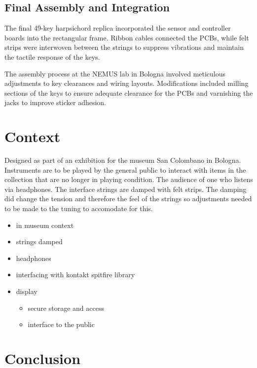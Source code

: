 \subsection{Final Assembly and Integration}

The final 49-key harpsichord replica incorporated the sensor and controller boards into the rectangular frame. Ribbon cables connected the PCBs, while felt strips were interwoven between the strings to suppress vibrations and maintain the tactile response of the keys.

The assembly process at the NEMUS lab in Bologna involved meticulous adjustments to key clearances and wiring layouts. Modifications included milling sections of the keys to ensure adequate clearance for the PCBs and varnishing the jacks to improve sticker adhesion.

\section{Context}\label{context}

Designed as part of an exhibition for the museum San Colombano in Bologna. Instruments are to be played by the general public to interact with items in the collection that are no longer in playing condition. The audience of one who listens via headphones. The interface strings are damped with felt strips. The damping did change the tension and therefore the feel of the strings so
adjustments needed to be made to the tuning to accomodate for this.

\begin{itemize}
\item
  in museum context
\item
  strings damped
\item
  headphones
\item
  interfacing with kontakt spitfire library
\item
  display

  \begin{itemize}
  \item
    secure storage and access
  \item
    interface to the public
  \end{itemize}
\end{itemize}



\section{Conclusion}\label{conclusion}

